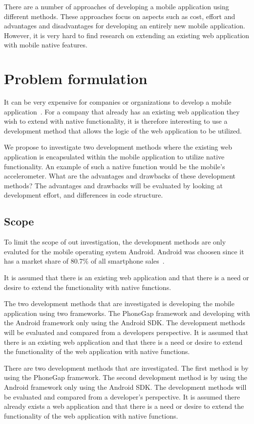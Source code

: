 There are a number of approaches of developing a mobile application using different methods. These approaches focus on aspects such as cost, effort and advantages and disadvantages for developing an entirely new mobile application. However, it is very hard to find research on extending an existing web application with mobile native features.

\section{Problem formulation}\label{sec:problem-formulation}
It can be very expensive for companies or organizations to develop a mobile application~\cite{kohan2015}. 
For a company that already has an existing web application they wish to extend with native functionality, it is therefore interesting to use a development method that allows the logic of the web application to be utilized.

We propose to investigate two development methods where the existing web application is encapsulated within the mobile application to utilize native functionality. An example of such a native function would be the mobile's accelerometer. What are the advantages and drawbacks of these development methods? The advantages and drawbacks will be evaluated by looking at development effort, and differences in code structure.

\subsection{Scope} \label{subsec:scope}
To limit the scope of out investigation, the development methods are only evaluted for the mobile operating system Android. Android was choosen since it has a market share of 80.7\% of all smartphone sales~\cite{gartner2015}.

It is assumed that there is an existing web application and that there is a need or desire to extend the functionality with native functions.

The two development methods that are investigated is developing the mobile application using two frameworks. The PhoneGap framework and developing with the Android framework only using the Android SDK. The development methods will be evaluated and compared from a developers perspective. It is assumed that there is an existing web application and that there is a need or desire to extend the functionality of the web application with native functions.

There are two development methods that are investigated. The first method is by using the PhoneGap framework. The second development method is by using the Android framework only using the Android SDK. The development methods will be evaluated and compared from a developer's perspective. It is assumed there already exists	a web application and that there is a need or desire to extend the functionality of the web application with native functions.

